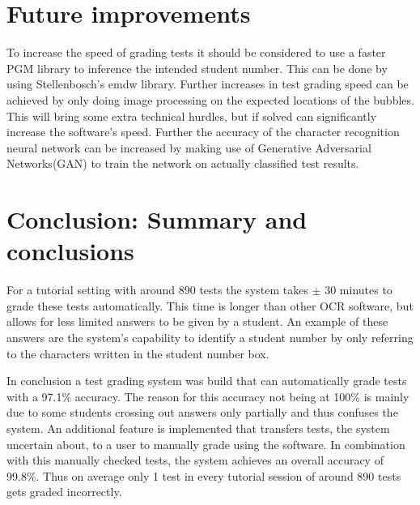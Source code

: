 \section{Future improvements}

To increase the speed of grading tests it should be considered to use a faster PGM library to inference the intended student number. This can be done by using Stellenbosch's emdw library. Further increases in test grading speed can be achieved by only doing image processing on the expected locations of the bubbles. This will bring some extra technical hurdles, but if solved can significantly increase the software's speed. Further the accuracy of the character recognition neural network can be increased by making use of Generative Adversarial Networks(GAN) to train the network on actually classified test results.

\section{Conclusion: Summary and conclusions}

For a tutorial setting with around 890 tests the system takes $\pm$ 30 minutes to grade these tests automatically. This time is longer than other OCR software, but allows for less limited answers to be given by a student. An example of these answers are the system's capability to identify a student number by only referring to the characters written in the student number box.

In conclusion a test grading system was build that can automatically grade tests with a 97.1\% accuracy. The reason for this accuracy not being at 100\% is mainly due to some students crossing out answers only partially and thus confuses the system. An additional feature is implemented that transfers tests, the system uncertain about, to a user to manually grade using the software. In combination with this manually checked tests, the system achieves an overall accuracy of 99.8\%. Thus on average only 1 test in every tutorial session of around 890 tests gets graded incorrectly.